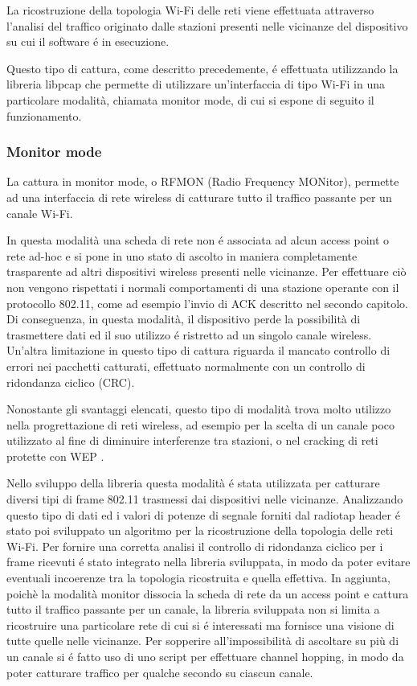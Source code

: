 La ricostruzione della topologia Wi-Fi delle reti viene effettuata attraverso l'analisi del traffico originato dalle stazioni presenti nelle vicinanze del dispositivo su cui il software \'e in esecuzione.

Questo tipo di cattura, come descritto precedemente, \'e effettuata utilizzando la libreria libpcap che permette di utilizzare un'interfaccia di tipo Wi-Fi in una particolare modalit\`a, chiamata monitor mode, di cui si espone di seguito il funzionamento.

\subsubsection{Monitor mode}
La cattura in monitor mode, o RFMON (Radio Frequency MONitor), permette ad una interfaccia di rete wireless di catturare tutto il traffico passante per un canale Wi-Fi.

In questa modalit\`a una scheda di rete non \'e associata ad alcun access point o rete ad-hoc e si pone in uno stato di ascolto in maniera completamente trasparente ad altri dispositivi wireless presenti nelle vicinanze.
Per effettuare ci\`o non vengono rispettati i normali comportamenti di una stazione operante con il protocollo 802.11, come ad esempio l'invio di ACK descritto nel secondo capitolo.
Di conseguenza, in questa modalit\`a, il dispositivo perde la possibilit\`a di trasmettere dati ed il suo utilizzo \'e ristretto ad un singolo canale wireless.
Un'altra limitazione in questo tipo di cattura riguarda il mancato controllo di errori nei pacchetti catturati, effettuato normalmente con un controllo di ridondanza ciclico (CRC).

Nonostante gli svantaggi elencati, questo tipo di modalit\`a trova molto utilizzo nella progrettazione di reti wireless, ad esempio per la scelta di un canale poco utilizzato al fine di diminuire interferenze tra stazioni, o nel cracking di reti protette con WEP .

Nello sviluppo della libreria questa modalit\`a \'e stata utilizzata per catturare diversi tipi di frame 802.11 trasmessi dai dispositivi nelle vicinanze.
Analizzando questo tipo di dati ed i valori di potenze di segnale forniti dal radiotap header \'e stato poi sviluppato un algoritmo per la ricostruzione della topologia delle reti Wi-Fi.
Per fornire una corretta analisi il controllo di ridondanza ciclico per i frame ricevuti  \'e stato integrato nella libreria sviluppata, in modo da poter evitare eventuali incoerenze tra la topologia ricostruita e quella effettiva.
In aggiunta, poich\`e la modalit\`a monitor dissocia la scheda di rete da un access point e cattura tutto il traffico passante per un canale, la libreria sviluppata non si limita a ricostruire una particolare rete di cui si \'e interessati ma fornisce una visione di tutte quelle nelle vicinanze.
Per sopperire all'impossibilit\`a di ascoltare su pi\`u di un canale si \'e fatto uso di uno script per effettuare channel hopping, in modo da poter catturare traffico per qualche secondo su ciascun canale.

